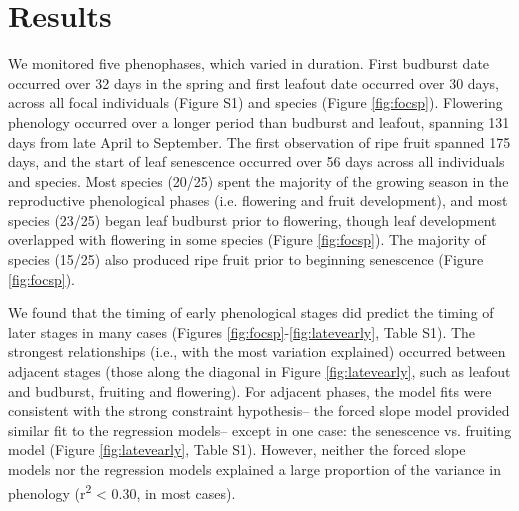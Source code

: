 \documentclass{article}
\begin{document}
\section* {Results}
\par We monitored five phenophases, which varied in duration. First budburst date occurred over 32 days in the spring and first leafout date occurred over 30 days, across all focal individuals (Figure S1) and species (Figure \ref{fig:focsp}). Flowering phenology occurred over a longer period than budburst and leafout, spanning 131 days from late April to September. The first observation of ripe fruit spanned 175 days, and the start of leaf senescence occurred over 56 days across all individuals and species. Most species (20/25) spent the majority of the growing season in the reproductive phenological phases (i.e. flowering and fruit development), and most species (23/25) began leaf budburst prior to flowering, though leaf development overlapped with flowering in some species (Figure \ref{fig:focsp}). The majority of species (15/25) also produced ripe fruit prior to beginning senescence (Figure \ref{fig:focsp}).
\par We found that the timing of early phenological stages did predict the timing of later stages in many cases (Figures \ref{fig:focsp}-\ref{fig:latevearly}, Table S1). The strongest relationships (i.e., with the most variation explained) occurred between adjacent stages (those along the diagonal in Figure \ref{fig:latevearly}, such as leafout and budburst, fruiting and flowering). For adjacent phases, the model fits were consistent with the strong constraint hypothesis-- the forced slope model provided similar fit to the regression models-- except in one case: the senescence vs. fruiting model (Figure \ref{fig:latevearly}, Table S1). %
However, neither the forced slope models nor the regression models explained a large proportion of the variance in phenology (r\textsuperscript{2} < 0.30, in most cases).
\end{document}
